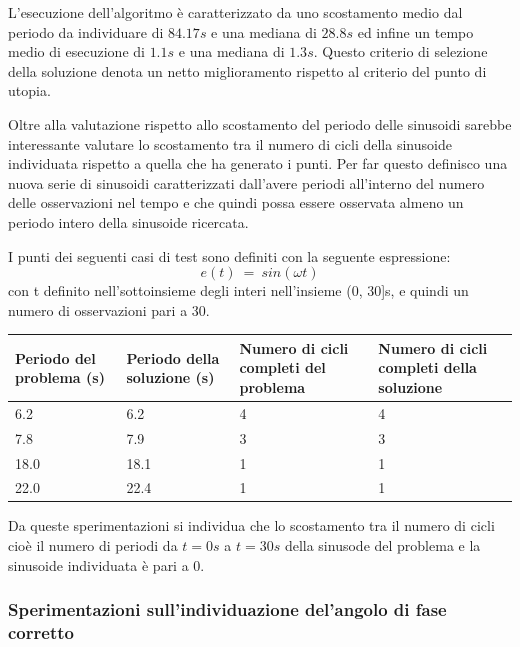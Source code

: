 \documentclass[a4paper,12pt]{report}
\begin{document}
L'esecuzione dell'algoritmo è caratterizzato da uno scostamento medio dal periodo da individuare di $84.17s$ e una mediana di $28.8s$ ed infine un tempo medio di esecuzione di $1.1s$ e una mediana di $1.3s$.
Questo criterio di selezione della soluzione denota un netto miglioramento rispetto al criterio del punto di utopia.

Oltre alla valutazione rispetto allo scostamento del periodo delle sinusoidi sarebbe interessante valutare lo scostamento tra il numero di cicli della sinusoide individuata rispetto a quella che ha generato i punti. Per far questo definisco una nuova serie di sinusoidi caratterizzati dall'avere periodi all'interno del numero delle osservazioni nel tempo e che quindi possa essere osservata almeno un periodo intero della sinusoide ricercata.

I punti dei seguenti casi di test sono definiti con la seguente espressione:
\begin{equation}
  e(t)~=~sin(\omega t)
\end{equation}
con t definito nell'sottoinsieme degli interi nell'insieme (0, 30]s, e quindi un numero di osservazioni pari a 30.

\begin{table}[H]
  \begin{center}
    \begin{tabularx}{\textwidth}{p{4cm}p{4cm}p{3cm}p{3cm}}
      \toprule
      {Periodo \newline del problema (s)} & {Periodo \newline della soluzione (s)} & {Numero di \newline cicli completi del problema} & {Numero di \newline cicli completi della soluzione}\\
      \midrule
      6.2 &  6.2  & 4 & 4 \\
      7.8 &  7.9 & 3 & 3 \\
      18.0 &  18.1  & 1 & 1 \\
      22.0 &  22.4  & 1 & 1 \\
      \bottomrule
    \end{tabularx}
  \end{center}
\end{table}

Da queste sperimentazioni si individua che lo scostamento tra il numero di cicli cioè il numero di periodi da $t=0s$ a $t=30s$ della sinusode del problema e la sinusoide individuata è pari a 0.

\subsubsection{Sperimentazioni sull'individuazione del'angolo di fase corretto}
\end{document}
